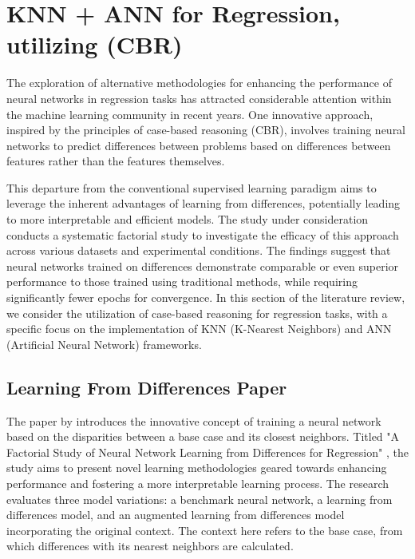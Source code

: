 \documentclass[a4paper, 12pt]{report}
\begin{document}
\section{KNN + ANN for Regression, utilizing (CBR)}

The exploration of alternative methodologies for enhancing the performance of neural networks in regression tasks has attracted considerable attention within the machine
learning community in recent years. One innovative approach, inspired by the principles of case-based reasoning (CBR),
involves training neural networks to predict differences between problems based on differences between features rather than the features themselves.

This departure from the conventional supervised learning paradigm aims to leverage the inherent advantages of learning from differences, potentially
leading to more interpretable and efficient models. The study under consideration \cite{learningFromDifferences2022} conducts a
systematic factorial study to investigate the efficacy of this approach across various datasets and experimental conditions.
The findings suggest that neural networks trained on differences demonstrate comparable or even superior performance to those trained using traditional methods,
while requiring significantly fewer epochs for convergence. In this section of the literature review, we consider the utilization of case-based reasoning for regression tasks,
with a specific focus on the implementation of KNN (K-Nearest Neighbors) and ANN (Artificial Neural Network) frameworks.

\subsection{Learning From Differences Paper}

The paper by \cite{learningFromDifferences2022} introduces the innovative concept of training a neural network based on the disparities between a base case and its closest neighbors.
Titled "A Factorial Study of Neural Network Learning from Differences for Regression" \cite{learningFromDifferences2022},
the study aims to present novel learning methodologies geared towards enhancing performance and fostering a more interpretable learning process.
The research evaluates three model variations: a benchmark neural network, a learning from differences model, and an augmented learning from differences model incorporating the original context.
The context here refers to the base case, from which differences with its nearest neighbors are calculated.
\end{document}
